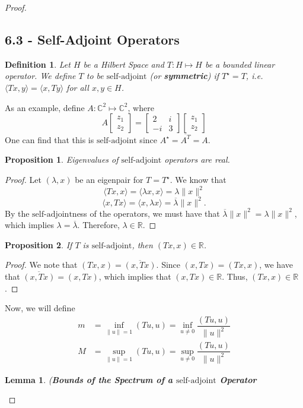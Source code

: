 \documentclass[oneside]{book}
\newtheorem{lemma}{Lemma}
\newtheorem{definition}{Definition}
\newtheorem{proposition}{Proposition}
\newcommand{\R}{{\mathbb R}}
\newcommand{\C}{{\mathbb C}}
\newcommand{\la}{\langle}
\newcommand{\ra}{\rangle}
\newcommand{\ov}{\overline}
\newcommand{\Ts}{T^{\star}}
\newcommand{\As}{A^{\star}}
\newcommand{\saj}{\text{self-adjoint}}
\begin{document}
\begin{proof}
\subsection*{6.3 - Self-Adjoint Operators}
\begin{definition}
Let $H$ be a Hilbert Space and $T: H \mapsto H$ be a bounded linear operator. We define $T$ to be \textbf{$\saj$} (or \textbf{symmetric}) if $\Ts = T$, i.e. $\la Tx, y \ra = \la x, Ty \ra$ for all $x, y \in H$.
\end{definition}
As an example, define $A: \C^2 \mapsto \C^2$, where 
\[ A \left[ \begin{matrix}
z_1 \\
z_2
\end{matrix} \right] = \left[ \begin{matrix}
2 & i \\
-i & 3 
\end{matrix}\right] \left[ \begin{matrix}
z_1 \\
z_2
\end{matrix}\right] \]
One can find that this is $\saj$ since $\As = \ov{A^T} = A$.
\begin{proposition}
Eigenvalues of $\saj$ operators are real. 
\end{proposition}
\begin{proof}
Let $(\lambda, x)$ be an eigenpair for $T = \Ts$. We know that 
\[ \la Tx, x \ra = \la \lambda x, x \ra = \lambda \| x\|^2\]
\[ \la x, Tx \ra = \la x, \lambda x \ra = \ov{\lambda} \| x\|^2.\]
By the $\saj$ness of the operators, we must have that $\ov{\lambda} \| x\|^2 = \lambda \| x \|^2$, which implies $\lambda = \ov{\lambda}$. Therefore, $\lambda \in \R$. 
\end{proof}
\begin{proposition}
If $T$ is $\saj$, then $(Tx, x) \in \R$. 
\end{proposition}
\begin{proof}
We note that $(Tx, x) = \ov{(x, Tx)}$. Since $(x, Tx) = (Tx, x)$, we have that $\ov{(x, Tx)} = (x, Tx)$, which implies that $(x, Tx) \in \R$. Thus, $(Tx, x) \in \R$. 
\end{proof}
Now, we will define 
\begin{align*}
m & = \inf_{\| u \| = 1} (Tu, u)  = \inf_{u \neq 0} \dfrac{(Tu, u)}{\| u \|^2}\\
M & = \sup_{\| u \| = 1} (Tu, u)  = \sup_{u \neq 0} \dfrac{(Tu, u)}{\| u \|^2}
\end{align*}
\begin{lemma} (\textbf{Bounds of the Spectrum of a $\saj$ Operator}

\end{lemma}
\end{proof}
\end{document}
